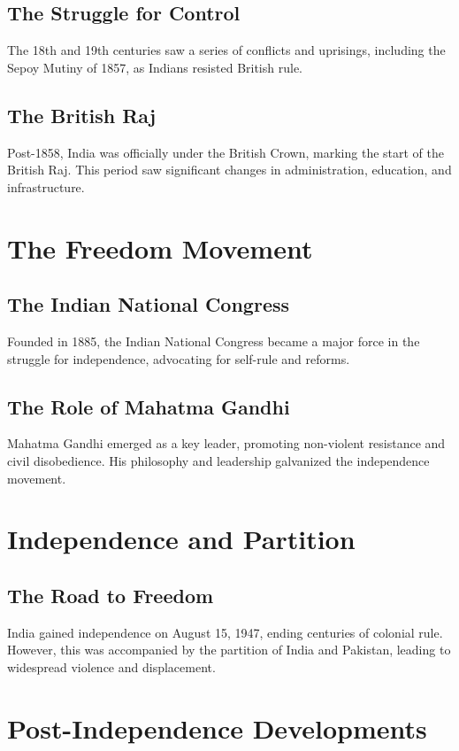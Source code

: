 \documentclass[a4paper,12pt]{book}
\begin{document}
\subsection{The Struggle for Control}
The 18th and 19th centuries saw a series of conflicts and uprisings, including the Sepoy Mutiny of 1857, as Indians resisted British rule.

\subsection{The British Raj}
Post-1858, India was officially under the British Crown, marking the start of the British Raj. This period saw significant changes in administration, education, and infrastructure.

\section{The Freedom Movement}
\label{sec:freedom-movement}

\subsection{The Indian National Congress}
Founded in 1885, the Indian National Congress became a major force in the struggle for independence, advocating for self-rule and reforms.

\subsection{The Role of Mahatma Gandhi}
Mahatma Gandhi emerged as a key leader, promoting non-violent resistance and civil disobedience. His philosophy and leadership galvanized the independence movement.

\section{Independence and Partition}
\label{sec:independence-partition}

\subsection{The Road to Freedom}
India gained independence on August 15, 1947, ending centuries of colonial rule. However, this was accompanied by the partition of India and Pakistan, leading to widespread violence and displacement.

\section{Post-Independence Developments}
\label{sec:post-independence-developments}
\end{document}
